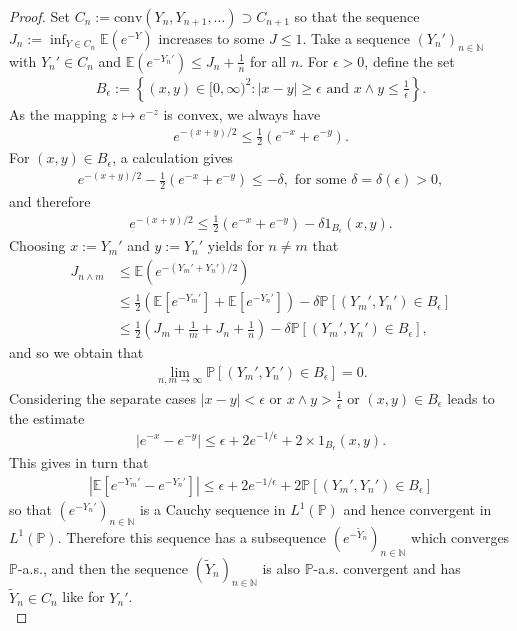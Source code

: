 \documentclass[12pt,a4paper, twoside]{article}
\theoremstyle{definition}
\newcommand{\EE}{\mathbb{E}} %
\newcommand{\PP}{\mathbb{P}} %
\begin{document}
\begin{proof}
Set $C_n := \text{conv}(Y_n, Y_{n+1}, \dots) \supset C_{n+1}$ so that the sequence $J_n := \inf_{Y \in C_n} \EE(e^{-Y})$ increases to some $J \leq 1$. Take a sequence $(Y_n')_{n \in \mathbb{N}}$ with $Y_n' \in C_n$ and $\EE(e^{-Y_n'}) \leq J_n + \frac{1}{n}$ for all $n$. For $\epsilon >0$, define the set 
\begin{align*}
B_\epsilon := \left\{ (x,y) \in [0, \infty)^2 : |x-y| \geq \epsilon \text{ and } x \wedge y \leq \frac{1}{\epsilon} \right\}.
\end{align*}
As the mapping $z \mapsto e^{-z}$ is convex, we always have 
\begin{align*}
e^{-(x+y)/2} \leq \frac{1}{2}( e^{-x} + e^{-y}). 
\end{align*}
For $(x,y) \in B_\epsilon$, a calculation gives 
\begin{align*}
e^{-(x+y)/2}- \frac{1}{2}(e^{-x}+ e^{-y}) \leq - \delta, \text{ for some } \delta= \delta( \epsilon)>0,
\end{align*}
and therefore 
\begin{align*}
e^{-(x+y)/2} \leq \frac{1}{2}(e^{-x}+e^{-y})- \delta 1_{ B_\epsilon}(x,y).
\end{align*}
\newpage
Choosing $x:= Y_m'$ and $y:= Y_n'$ yields for $n \neq m$ that 
\begin{align*}
J_{n \wedge m} & \leq \EE \left( e^{-(Y_m' + Y_n')/2} \right) \\
& \leq \frac{1}{2} \left( \EE[e^{-Y_m'}] + \EE[e^{-Y_n'}] \right) - \delta \PP[(Y_m',Y_n') \in B_\epsilon] \\
& \leq \frac{1}{2} \left( J_m + \frac{1}{m}+ J_n + \frac{1}{n}\right) - \delta \PP[(Y_m', Y_n') \in B_\epsilon],
\end{align*}
and so we obtain that
\begin{align*}
\lim_{n,m \to \infty} \PP[(Y_m', Y_n') \in B_\epsilon]=0.
\end{align*}
Considering the separate cases $|x-y| < \epsilon$ or $x \wedge y > \frac{1}{\epsilon}$ or $(x,y) \in B_\epsilon$ leads to the estimate
\begin{align*}
|e^{-x}-e^{-y}| \leq \epsilon + 2e^{-1/ \epsilon} + 2 \times 1_{B_\epsilon}(x,y).
\end{align*}
This gives in turn that 
\begin{align*}
\left| \EE[e^{-Y_m'}-e^{-Y_n'}] \right| \leq \epsilon + 2e^{-1/ \epsilon} + 2 \PP[(Y_m',Y_n') \in B_\epsilon]
\end{align*}
so that $(e^{-Y_n'})_{n \in \mathbb{N}}$ is a Cauchy sequence in $L^1( \PP)$ and hence convergent in $L^1( \PP)$. Therefore this sequence has a subsequence $(e^{- \widetilde{Y}_n})_{n \in \mathbb{N}}$ which converges $\PP$-a.s., and then the sequence $(\widetilde{Y}_n)_{n \in \mathbb{N}}$ is also $\PP$-a.s. convergent and has $\widetilde{Y}_n \in C_n$ like for $Y_n'$. \\

\end{proof}
\end{document}
